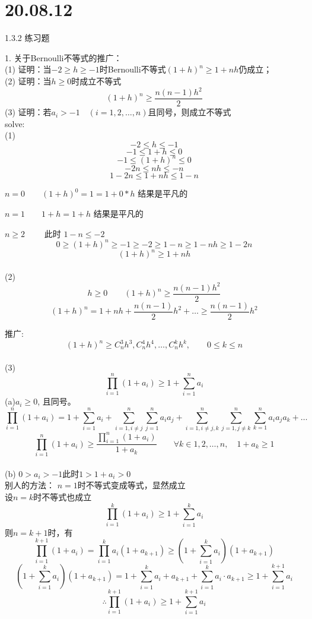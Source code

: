\documentclass[10pt,a4paper]{book}
\begin{document}
	\section{20.08.12}
	1.3.2 练习题
	
	1. 关于Bernoulli不等式的推广：
	\\(1) 证明：当$ -2\ge h\ge -1 $时Bernoulli不等式$ (1+h)^n \ge 1+nh $仍成立；\\
	(2) 证明：当$ h\ge 0 $时成立不等式 
	\begin{equation}
		(1+h)^n\ge \frac{n(n-1)h^2}{2}
	\end{equation} 
	(3) 证明：若$ a_i>-1 \quad (i=1,2,\dots,n) $且同号，则成立不等式\\
	solve:\\
	(1)
	\[ -2 \leq h \leq -1 \]
	\[ -1 \leq 1+h \leq 0 \]
	\[ -1 \leq (1+h)^n \leq 0 \]
	\[ -2n \leq nh \leq -n \]
	\[ 1-2n \leq 1+nh \leq 1-n \]
	
	$ n=0 \qquad (1+h)^0 = 1 = 1+0*h $  结果是平凡的
	
	$ n=1 \qquad 1+h = 1+h $ 结果是平凡的
	
	$ n \geq 2 \qquad $ 此时 $ 1-n \leq -2 $
	\[ 0 \geq (1+h)^n \geq -1 \geq -2 \geq 1-n \geq 1-nh \geq 1- 2n  \]
	\[ (1+h)^n \geq 1+nh \]
	\\
	(2) 
	\[ h\geq 0 \qquad (1+h)^n \geq \frac{n(n-1)h^2}{2} \]
	\[ (1+h)^n=1+nh+\frac{n(n-1)}{2}h^2 + \dots \geq \frac{n(n-1)}{2}h^2  \]
	
	推广:
	\[ (1+h)^n \geq C_n^3 h^3, C_n^4 h^4, \dots , C_n^k h^k ,\qquad 0\leq k\leq n\]
	\\
	(3) 
	\[ \prod_{i=1}^n (1+a_i)\ge 1+\sum_{i=1}^n a_i \]
	(a)$ a_i \ge 0$, 且同号。 
	\[ \prod_{i=1}^n (1+a_i) = 1+ \sum_{i=1}^n a_i + \sum_{i=1,i\neq j}^n \sum_{j=1}^n a_i a_j + \sum_{i=1,i\neq j,k}^n \sum_{j=1,j\neq k}^n \sum_{k=1}^n a_i a_j a_k+\dots \]
	\[ \prod_{i=1}^n (1+a_i) \geq \frac{\prod_{i=1}^n(1+a_i)}{1+a_k} \qquad \forall k\in 1,2,\dots , n,\quad 1+a_k \geq 1 \]
	\\
	(b) $ 0 > a_i > -1 \text{此时} 1 > 1+a_i > 0$
	\\别人的方法：
	$ n=1 $时不等式变成等式，显然成立\\
	设$ n=k $时不等式也成立
	\[ \prod_{i=1}^k(1+a_i)\ge 1+\sum_{i=1}^k a_i\]
	则$ n=k+1 $时，有
	\[ \prod_{i=1}^{k+1}(1+a_i) = \prod_{i=1}^k a_i (1 + a_{k+1}) \ge (1+\sum_{i=1}^k a_i) (1+a_{k+1})\]
	\[(1+\sum_{i=1}^k a_i) (1+a_{k+1})=1+\sum_{i=1}^k a_i + a_{k+1} + \sum_{i=1}^k a_i\cdot a_{k+1} \ge 1+\sum_{i=1}^{k+1} a_i \]
	\[\therefore \prod_{i=1}^{k+1}(1+a_i)\ge 1+\sum_{i=1}^{k+1} a_i\]
	
\end{document}
